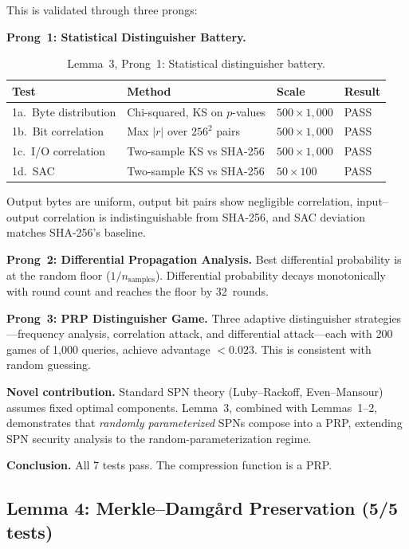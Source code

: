 \documentclass[preprint]{iacrtrans}
\begin{document}
This is validated through three prongs:

\medskip
\noindent\textbf{Prong~1: Statistical Distinguisher Battery.}

\begin{table}[h]
\centering
\small
\begin{tabular}{@{}llll@{}}
\toprule
\textbf{Test} & \textbf{Method} & \textbf{Scale} & \textbf{Result} \\
\midrule
1a.\ Byte distribution & Chi-squared, KS on $p$-values & $500 \times 1{,}000$ & PASS \\
1b.\ Bit correlation & Max $|r|$ over $256^2$ pairs & $500 \times 1{,}000$ & PASS \\
1c.\ I/O correlation & Two-sample KS vs SHA-256 & $500 \times 1{,}000$ & PASS \\
1d.\ SAC & Two-sample KS vs SHA-256 & $50 \times 100$ & PASS \\
\bottomrule
\end{tabular}
\caption{Lemma~3, Prong~1: Statistical distinguisher battery.}
\end{table}

Output bytes are uniform, output bit pairs show negligible correlation, input--output correlation is indistinguishable from SHA-256, and SAC deviation matches SHA-256's baseline.

\medskip
\noindent\textbf{Prong~2: Differential Propagation Analysis.} Best differential probability is at the random floor ($1/n_{\text{samples}}$). Differential probability decays monotonically with round count and reaches the floor by 32~rounds.

\medskip
\noindent\textbf{Prong~3: PRP Distinguisher Game.} Three adaptive distinguisher strategies---frequency analysis, correlation attack, and differential attack---each with 200 games of 1{,}000 queries, achieve advantage $< 0.023$. This is consistent with random guessing.

\textbf{Novel contribution.} Standard SPN theory (Luby--Rackoff, Even--Mansour) assumes fixed optimal components. Lemma~3, combined with Lemmas~1--2, demonstrates that \emph{randomly parameterized} SPNs compose into a PRP, extending SPN security analysis to the random-parameterization regime.

\textbf{Conclusion.} All 7 tests pass. The compression function is a PRP.

\subsection{Lemma 4: Merkle--Damg{\aa}rd Preservation (5/5 tests)}
\end{document}
